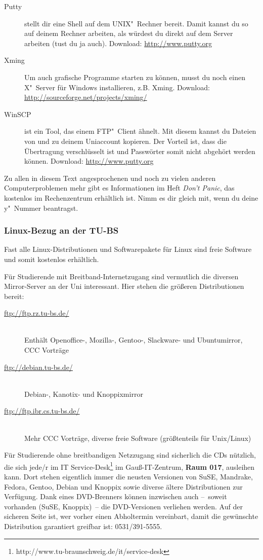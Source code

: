 		\begin{description}
			\item[Putty] stellt dir eine Shell auf dem
			  UNIX"~Rechner bereit. Damit kannst du so auf
			  deinem Rechner arbeiten, als würdest du direkt
			  auf dem Server arbeiten (tust du ja auch).  Download:
			  \url{http://www.putty.org}
			\item[Xming] Um
			  auch grafische Programme starten zu können,
			  musst du noch einen X"~Server für Windows
			  installieren, z.B. Xming. Download:
			  \url{http://sourceforge.net/projects/xming/}
			\item[WinSCP] ist ein Tool, das einem
			  FTP"~Client ähnelt. Mit diesem kannst du
			  Dateien von und zu deinem Uniaccount kopieren.
			  Der Vorteil ist, dass die Übertragung
			  verschlüsselt ist und Passwörter somit nicht
			  abgehört werden können. Download: \url{http://www.putty.org}
		\end{description}

		Zu allen in diesem Text angesprochenen und noch zu vielen anderen Computerproblemen mehr gibt es Informationen im Heft \emph{Don't Panic}, das kostenlos im Rechenzentrum erhältlich ist. Nimm es dir gleich mit, wenn du deine y"~Nummer beantragst.

	\subsubsection{Linux-Bezug an der TU-BS}
		Fast alle Linux-Distributionen und Softwarepakete für Linux sind freie Software und somit kostenlos erhältlich.

		Für Studierende mit Breitband-Internetzugang sind vermutlich die diversen Mirror-Server an der Uni interessant. Hier stehen die größeren Distributionen bereit:
	  
		\begin{description}
			\item[\url{ftp://ftp.rz.tu-bs.de/}]~\\Enthält Openoffice-, Mozilla-, Gentoo-, Slackware- und Ubuntumirror, CCC Vorträge
			\item[\url{ftp://debian.tu-bs.de/}]~\\Debian-, Kanotix- und Knoppixmirror
			\item[\url{ftp://ftp.ibr.cs.tu-bs.de/}]~\\Mehr CCC Vorträge, diverse freie Software (größtenteils für Unix/Linux)
		\end{description}

		Für Studierende ohne breitbandigen Netzzugang sind sicherlich die CDs nützlich, die sich jede/r im IT Service-Desk\footnote{http://www.tu-braunschweig.de/it/service-desk} im Gauß-IT-Zentrum, \textbf{Raum 017}, ausleihen kann. Dort stehen eigentlich immer die neusten Versionen von SuSE, Mandrake, Fedora, Gentoo, Debian und Knoppix sowie diverse ältere Distributionen zur Verfügung. Dank eines DVD-Brenners können inzwischen auch --~soweit vorhanden (SuSE, Knoppix)~-- die DVD-Versionen verliehen werden. Auf der sicheren Seite ist, wer vorher einen Abholtermin vereinbart, damit die gewünschte Distribution garantiert greifbar ist: 0531/391-5555.
